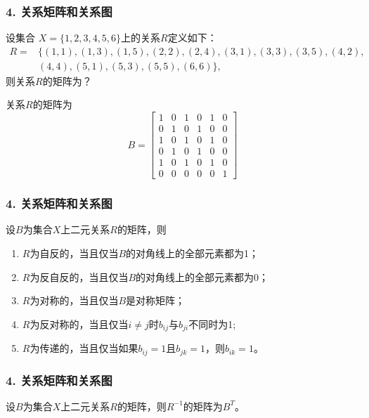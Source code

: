 \documentclass{beamer}
\begin{document}
\begin{CJK*}{UTF8}{gbsn}
\begin{frame}
  \frametitle{4. 关系矩阵和关系图}
  \begin{Ex}
  设集合
    $X=\{1,2,3,4,5,6 \}$上的关系$R$定义如下：
    \begin{align*}
      R=&\{(1,1),(1,3),(1,5),(2,2),(2,4),(3,1),(3,3),(3,5),(4,2),\\
      &(4,4),(5,1),(5,3),(5,5),(6,6)\},
    \end{align*}
    则关系$R$的矩阵为？
  \end{Ex}
   \pause
  关系$R$的矩阵为
      \[B=\begin{bmatrix}
          1&0&1&0&1&0\\
          0&1&0&1&0&0\\
          1&0&1&0&1&0\\
          0&1&0&1&0&0\\
          1&0&1&0&1&0\\
          0&0&0&0&0&1
        \end{bmatrix}
      \]
\end{frame}
\begin{frame}
  \frametitle{4. 关系矩阵和关系图}
  \begin{Thm}
  设$B$为集合$X$上二元关系$R$的矩阵，则
  \begin{enumerate}[(1)]
  \item $R$为自反的，当且仅当$B$的对角线上的全部元素都为1；
  \item $R$为反自反的，当且仅当$B$的对角线上的全部元素都为0；
  \item $R$为对称的，当且仅当$B$是对称矩阵；
  \item $R$为反对称的，当且仅当$i \neq j$时$b_{ij}$与$b_{ji}$不同时为1;
  \item $R$为传递的，当且仅当如果$b_{ij}=1$且$b_{jk}=1$，则$b_{ik}=1$。
  \end{enumerate}
\end{Thm}
\end{frame}
\begin{frame}
  \frametitle{4. 关系矩阵和关系图}
  \begin{Thm}
    设$B$为集合$X$上二元关系$R$的矩阵，则$R^{-1}$的矩阵为$B^{T}$。
  \end{Thm}
\end{frame}


\end{CJK*}
\end{document}
